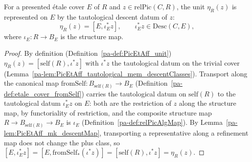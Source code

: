 \begin{theorem}
  \label{pa-thm:PicEtAff_unit_eq_mk}
  \leanok

  For a presented \'etale cover \(E\) of \(R\) and \(z \in \mathrm{relPic}(C, R)\), the unit
  \(\eta_R(z)\) is represented on \(E\) by the tautological descent datum of \(z\):
  \[
    \eta_R(z) = [E, \iota_E^{*}z], \qquad \iota_E^{*}z \in \mathrm{Desc}(C, E),
  \]
  where \(\iota_E \colon R \to B_E\) is the structure map.
\end{theorem}
\begin{proof}
  \leanok
  By definition (Definition~\ref{pa-def:PicEtAff_unit}) \(\eta_R(z) = [\mathrm{self}(R), \iota^{*}z]\)
  with \(\iota^{*}z\) the tautological datum on the trivial cover
  (Lemma~\ref{pa-lem:PicEtAff_tautological_mem_descentClasses}). Transport along the canonical map
  \(\mathrm{fromSelf} \colon B_{\mathrm{self}(R)} \to B_E\) (Definition~\ref{pa-def:etale_cover_fromSelf})
  carries the tautological datum on \(\mathrm{self}(R)\) to the tautological datum
  \(\iota_E^{*}z\) on \(E\): both are the restriction of \(z\) along the structure map, by
  functoriality of restriction, and the composite structure map \(R \to B_{\mathrm{self}(R)} \to
  B_E\) is \(\iota_E\) (Definition~\ref{pa-def:relPicAlgMap}). By
  Lemma~\ref{pa-lem:PicEtAff_mk_descentMap}, transporting a representative along a refinement map does
  not change the plus class, so \([E, \iota_E^{*}z] = [E, \mathrm{fromSelf}_{*}(\iota^{*}z)] =
  [\mathrm{self}(R), \iota^{*}z] = \eta_R(z)\).
\end{proof}

